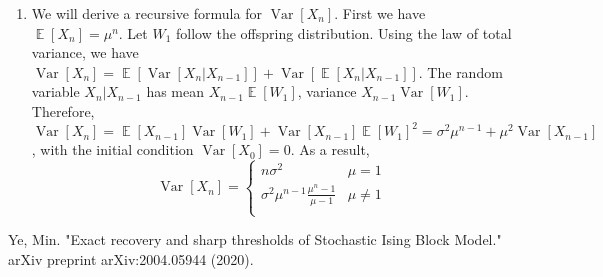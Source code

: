 \documentclass{article}
\DeclareMathOperator{\E}{\mathbb{E}}
\DeclareMathOperator{\Var}{Var}
\begin{document}
\begin{enumerate}
\item We will derive a recursive formula for $\Var[X_n]$. First we have $\E[X_n]=\mu^n$.
Let $W_1$ follow the offspring distribution.
Using the law of total variance, we have
$\Var[X_n]=\E[\Var[X_n|X_{n-1}]] + \Var[\E[X_n | X_{n-1}]]$.
The random variable $X_n | X_{n-1}$ has mean $X_{n-1} \E[W_1]$, variance
$X_{n-1}\Var[W_1]$. Therefore,
$\Var[X_n]=\E[X_{n-1}]\Var[W_1] + \Var[X_{n-1}]\E[W_1]^2
= \sigma^2 \mu^{n-1} + \mu^2 \Var[X_{n-1}]$, with the initial condition
$\Var[X_0]=0$.
As a result,
\begin{equation*}
    \Var[X_n] =\begin{cases}
    n\sigma^2 & \mu = 1\\
    \sigma^2 \mu^{n-1}
    \frac{\mu^n - 1}{\mu-1} & \mu \neq 1 \\
    \end{cases}
\end{equation*} 
\end{enumerate}

\begin{thebibliography}{9}
 Ye, Min. "Exact recovery and sharp thresholds of Stochastic Ising Block Model." arXiv preprint arXiv:2004.05944 (2020).

\end{thebibliography}
\end{document}
